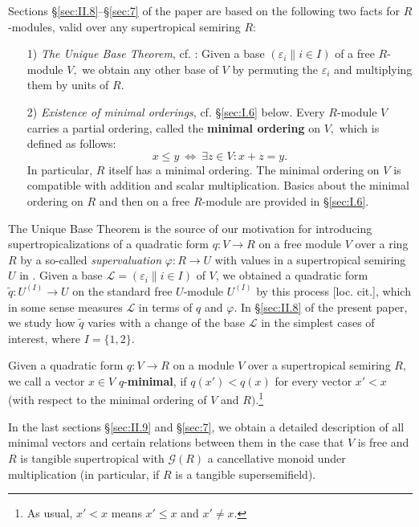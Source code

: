 \documentclass [12pt,a4paper,reqno]{amsart}
\begin{document}
Sections \S\ref{sec:II.8}--\S\ref{sec:7} of the paper are based on
the following two facts for $R$-modules, valid over any
supertropical  semiring $R:$
\begin{enumerate} {\setlength{\itemsep}{2pt}}
\item[1)] \textit{The Unique Base Theorem}, cf. {\cite[Theorem~{{0.9}}]{QF1}}:
Given a base $({\varepsilon}_i\|i\in I)$ of a free $R$-module $V,$ we
obtain any other base of $V$ by permuting the ${\varepsilon}_i$ and
multiplying them by units of $R.$

\item[2)] \textit{Existence of minimal orderings}, cf.
\S\ref{sec:I.6} below. Every $R$-module $V$ carries a partial
ordering, called the {\textbf{{minimal ordering}}} on $V,$ which is
defined as follows:
$$x\le y {\ {\Leftrightarrow} \ } \exists z\in V: x+z=y.$$
In particular, $R$ itself has a minimal ordering. The minimal
ordering on $V$ is compatible with addition and scalar
multiplication. Basics about the minimal ordering on $R$ and then
on a free $R$-module are provided in \S\ref{sec:I.6}.
\end{enumerate}

The Unique Base Theorem is the source of our motivation for
introducing supertropicalizations of a quadratic form $q:V\to R$
on a free module $V$ over a ring $R$ by a so-called
\textit{supervaluation} $\varphi:R\to U$ with values in a
supertropical semiring $U$ in {\cite[~\S{{9}}]{QF1}}. Given a base
${\mathcal L}=({\varepsilon}_i\|i\in I)$ of $V$, we obtained a
quadratic form ${\tilde q}:U^{(I)}\to U$ on the standard free
$U$-module $U^{(I)}$ by this process [loc. cit.], which in some
sense measures ${\mathcal L}$ in terms of $q$ and $\varphi.$ In
\S\ref{sec:II.8} of the present paper, we study how $\tilde q$ varies
with a change of the base ${\mathcal L}$ in the simplest cases of
interest, where $I=\{1,2\}.$

Given a quadratic form $q:V\to R$ on a module $V$ over a
supertropical semiring $R,$ we call a vector $x\in V$
$q$-{\textbf{{minimal}}}, if $q(x')<q(x)$ for every vector $x'<x$ (with
respect to the minimal ordering of $V$ and $R)$.\footnote{As
usual, $x'<x$ means $x'\le x$ and $x'\ne x.$}

In the last sections \S\ref{sec:II.9} and \S\ref{sec:7}, we obtain a
detailed description of  all minimal vectors and certain relations between
them in the case that $V$ is free and $R$ is tangible
supertropical with ${\mathcal G}(R)$ a cancellative monoid under
multiplication (in particular, if $R$ is a tangible
supersemifield).
\end{document}
